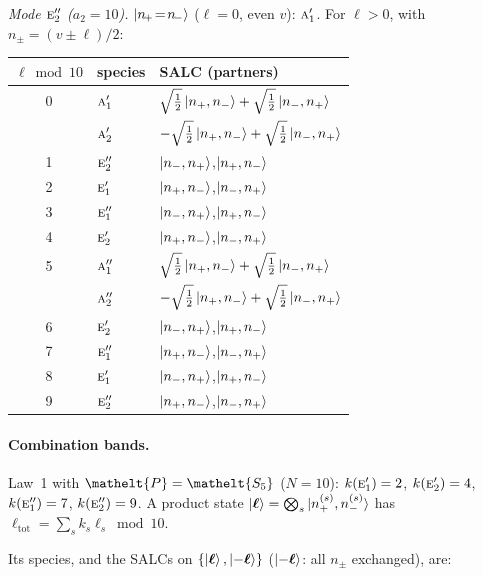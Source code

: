 \documentclass[11pt]{article}
\newcommand{\eltfont}[1]{{\let\sigma\eltsigma\mathelt{#1}}}
\newcommand{\irr}[1]{\text{\normalfont\scshape #1}}
\newcommand{\elt}[1]{\eltfont{#1}}
\newcommand{\pel}{\elt{P}}             %
\begin{document}
\emph{Mode $\irr{e}_{2}''$ ($a_2=10$).} $\ket{n_{\!+}\!=\!n_{\!-}}$ ($\ell=0$, even $v$): $\irr{a}_{1}'$. For $\ell>0$, with $n_\pm=(v\pm\ell)/2$:
\begin{longtable}{c l l}\hline $\ell\bmod 10$ & species & SALC (partners)\\ \hline\endhead
0 & $\irr{a}_{1}'$ & $\sqrt{\tfrac{1}{2}}\ket{n_+,n_-}+\sqrt{\tfrac{1}{2}}\ket{n_-,n_+}$\\
 & $\irr{a}_{2}'$ & $-\sqrt{\tfrac{1}{2}}\ket{n_+,n_-}+\sqrt{\tfrac{1}{2}}\ket{n_-,n_+}$\\
1 & $\irr{e}_{2}''$ & $\ket{n_-,n_+}$,\quad $\ket{n_+,n_-}$\\
2 & $\irr{e}_{1}'$ & $\ket{n_+,n_-}$,\quad $\ket{n_-,n_+}$\\
3 & $\irr{e}_{1}''$ & $\ket{n_-,n_+}$,\quad $\ket{n_+,n_-}$\\
4 & $\irr{e}_{2}'$ & $\ket{n_+,n_-}$,\quad $\ket{n_-,n_+}$\\
5 & $\irr{a}_{1}''$ & $\sqrt{\tfrac{1}{2}}\ket{n_+,n_-}+\sqrt{\tfrac{1}{2}}\ket{n_-,n_+}$\\
 & $\irr{a}_{2}''$ & $-\sqrt{\tfrac{1}{2}}\ket{n_+,n_-}+\sqrt{\tfrac{1}{2}}\ket{n_-,n_+}$\\
6 & $\irr{e}_{2}'$ & $\ket{n_-,n_+}$,\quad $\ket{n_+,n_-}$\\
7 & $\irr{e}_{1}''$ & $\ket{n_+,n_-}$,\quad $\ket{n_-,n_+}$\\
8 & $\irr{e}_{1}'$ & $\ket{n_-,n_+}$,\quad $\ket{n_+,n_-}$\\
9 & $\irr{e}_{2}''$ & $\ket{n_+,n_-}$,\quad $\ket{n_-,n_+}$\\
\hline\end{longtable}

\paragraph{Combination bands.}

Law~1 with $\pel=\elt{S_{5}}$ ($N=10$): $k(\irr{e}_{1}')=2$, $k(\irr{e}_{2}')=4$, $k(\irr{e}_{1}'')=7$, $k(\irr{e}_{2}'')=9$. A product state $\ket{\boldsymbol\ell}=\bigotimes_s\ket{n_+^{(s)},n_-^{(s)}}$ has $\ell_{\mathrm{tot}}=\sum_sk_s\ell_s\bmod 10$.

Its species, and the SALCs on $\{\ket{\boldsymbol\ell},\ket{-\boldsymbol\ell}\}$ ($\ket{-\boldsymbol\ell}$: all $n_\pm$ exchanged), are:
\end{document}
